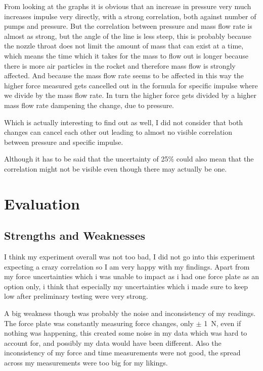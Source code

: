 \documentclass[12pt,a4paper]{article}
\begin{document}
From looking at the graphs it is obvious that an increase in pressure very much increases impulse very directly, with a strong correlation, both against number of pumps and pressure. But the correlation between pressure and mass flow rate is almost as strong, but the angle of the line is less steep, this is probably because the nozzle throat does not limit the amount of mass that can exist at a time, which means the time which it takes for the mass to flow out is longer because there is more air particles in the rocket and therefore mass flow is strongly affected. And because the mass flow rate seems to be affected in this way the higher force measured gets cancelled out in the formula for specific impulse where we divide by the mass flow rate. In turn the higher force gets divided by a higher mass flow rate dampening the change, due to pressure.

Which is actually interesting to find out as well, I did not consider that both changes can cancel each other out leading to almost no visible correlation between pressure and specific impulse.

Although it has to be said that the uncertainty of 25\% could also mean that the correlation might not be visible even though there may actually be one.

\section{Evaluation}

\subsection{Strengths and Weaknesses}

I think my experiment overall was not too bad, I did not go into this experiment expecting a crazy correlation so I am very happy with my findings. Apart from my force uncertainties which i was unable to impact as i had one force plate as an option only, i think that especially my uncertainties which i made sure to keep low after preliminary testing were very strong.

A big weakness though was probably the noise and inconsistency of my readings. The force plate was constantly measuring force changes, only $\pm$ \SI{1}{\newton}, even if nothing was happening, this created some noise in my data which was hard to account for, and possibly my data would have been different. Also the inconsistency of my force and time measurements were not good, the spread across my measurements were too big for my likings.
\end{document}
